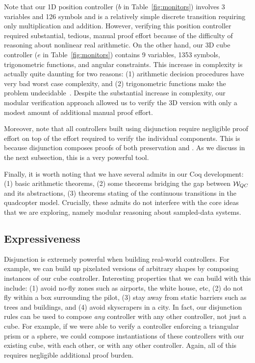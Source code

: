 Note that our 1D position controller ($b$ in Table~\ref{fig:monitors})
involves 3 variables and 126 symbols and is a relatively simple discrete
transition requiring only multiplication and addition.  However, verifying
this position controller required substantial, tedious, manual proof effort
because of the difficulty of reasoning about nonlinear real arithmetic.  On
the other hand, our 3D cube controller ($e$ in Table~\ref{fig:monitors})
contains 9 variables, 1353 symbols, trigonometric functions, and angular
constraints.  This increase in complexity is actually quite daunting for
two reasons: (1) arithmetic decision procedures have very bad worst case
complexity, and (2) trigonometric functions make the problem
undecidable~\cite{HarrisonLogic09}.  Despite the substantial increase in
complexity, our modular verification approach allowed us to verify the 3D
version with only a modest amount of additional manual proof effort.

Moreover, note that all controllers built using disjunction require
negligible proof effort on top of the effort required to verify the
individual components.  This is because disjunction composes proofs of both
preservation and \progress{}. As we discuss in the next subsection, this is
a very powerful tool.

Finally, it is worth noting that we have several admits in our Coq
development: (1) basic arithmetic theorems, (2) some theorems bridging the
gap between $\mathcal{W}_{QC}$ and its abstractions, (3) theorems
stating \progress{} of the continuous transitions in the quadcopter model.
Crucially, these admits do not interfere with the core ideas that we are
exploring, namely modular reasoning about sampled-data systems.

\subsection{Expressiveness}
Disjunction is extremely powerful when building real-world controllers.
For example, we can build up pixelated versions of arbitrary shapes by
composing instances of our cube controller.  Interesting properties that we
can build with this include: (1) avoid no-fly zones such as airports, the
white house, etc, (2) do not fly within a box surrounding the pilot, (3)
stay away from static barriers such as trees and buildings, and (4) avoid
skyscrapers in a city. In fact, our disjunction rules can be used to
compose \emph{any} controller with any other controller, not just a cube.
For example, if we were able to verify a controller enforcing a triangular
prism or a sphere, we could compose instantiations of these controllers
with our existing cube, with each other, or with any other controller.
Again, all of this requires negligible additional proof burden.

